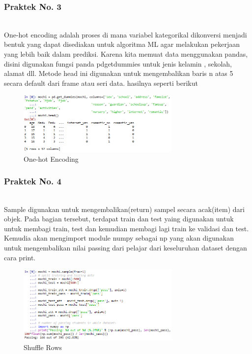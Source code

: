 \subsubsection{Praktek No. 3}
\hfill\\

One-hot encoding adalah proses di mana variabel kategorikal dikonversi menjadi bentuk yang dapat disediakan untuk algoritma ML agar melakukan pekerjaan yang lebih baik dalam prediksi. Karena kita memuat data menggunakan pandas, disini digunakan fungsi panda pdgetdummies untuk jenis kelamin , sekolah, alamat dll. Metode head ini digunakan untuk mengembalikan baris n atas 5 secara default dari frame atau seri data. hasilnya seperti berikut

\begin{figure}[H]
    \includegraphics[width=8cm]{figures/1174083/figures2/p3.png}
    \centering
    \caption{One-hot Encoding}
\end{figure}

\subsubsection{Praktek No. 4}
\hfill\\

Sample digunakan untuk mengembalikan(return) sampel secara acak(item) dari objek. Pada bagian tersebut, terdapat train dan test yaing digunakan untuk untuk membagi train, test dan kemudian membagi lagi train ke validasi dan test. Kemudia akan mengimport module numpy sebagai np yang akan digunakan untuk mengembalikan nilai passing dari pelajar dari keseluruhan dataset dengan cara print.

\begin{figure}[H]
    \includegraphics[width=8cm]{figures/1174083/figures2/p4.png}
    \centering
    \caption{Shuffle Rows}
\end{figure}

